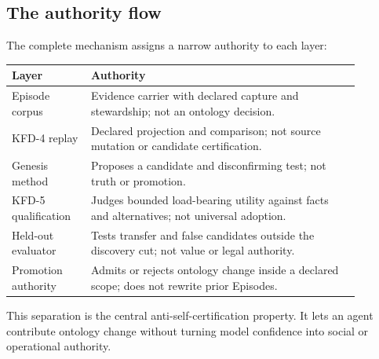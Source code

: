 \subsection{The authority flow}

The complete mechanism assigns a narrow authority to each layer:

\begin{center}
\begin{tabular}{p{0.20\linewidth}p{0.68\linewidth}}
\toprule
Layer & Authority \\
\midrule
Episode corpus & Evidence carrier with declared capture and stewardship; not
an ontology decision. \\
KFD-4 replay & Declared projection and comparison; not source mutation or
candidate certification. \\
Genesis method & Proposes a candidate and disconfirming test; not truth or
promotion. \\
KFD-5 qualification & Judges bounded load-bearing utility against facts and
alternatives; not universal adoption. \\
Held-out evaluator & Tests transfer and false candidates outside the discovery
cut; not value or legal authority. \\
Promotion authority & Admits or rejects ontology change inside a declared
scope; does not rewrite prior Episodes. \\
\bottomrule
\end{tabular}
\end{center}

This separation is the central anti-self-certification property. It lets an
agent contribute ontology change without turning model confidence into social
or operational authority.
